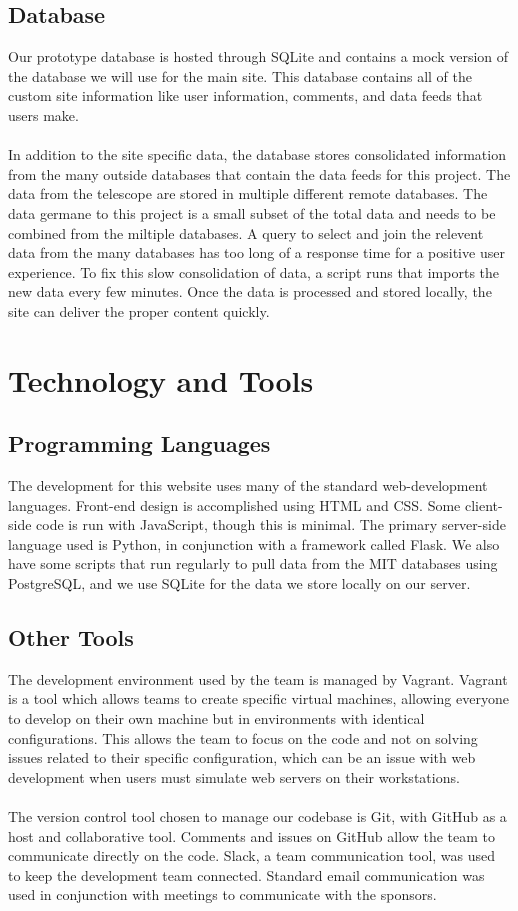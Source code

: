 \documentclass[12pt]{article}
\begin{document}
\begin{spacing}{1.5}
\subsection{Database}
Our prototype database is hosted through SQLite and contains a mock version of the database we will use for the  main site. This database contains all of the custom site information like user information, comments, and data feeds that users make. 
\\ \\
In addition to the site specific data, the database stores consolidated information from the many outside databases that contain the data feeds for this project. The data from the telescope are stored in multiple different remote databases. The data germane to this project is a small subset of the total data and needs to be combined from the miltiple databases. A query to select and join the relevent data from the many databases has too long of a response time for a positive user experience. To fix this slow consolidation of data, a script runs that imports the new data every few minutes. Once the data is processed and stored locally, the site can deliver the proper content quickly.

\section{Technology and Tools}
\subsection{Programming Languages}
The development for this website uses many of the standard web-development languages. Front-end design is accomplished using HTML and CSS. Some client-side code is run with JavaScript, though this is minimal. The primary server-side language used is Python, in conjunction with a framework called Flask. We also have some scripts that run regularly to pull data from the MIT databases using PostgreSQL, and we use SQLite for the data we store locally on our server.

\subsection{Other Tools}
The development environment used by the team is managed by Vagrant. Vagrant is a tool which allows teams to create specific virtual machines, allowing everyone to develop on their own machine but in environments with identical configurations. This allows the team to focus on the code and not on solving issues related to their specific configuration, which can be an issue with web development when users must simulate web servers on their workstations.
\\ \\
The version control tool chosen to manage our codebase is Git, with GitHub as a host and collaborative tool. Comments and issues on GitHub allow the team to communicate directly on the code. Slack, a team communication tool, was used to keep the development team connected. Standard email communication was used in conjunction with meetings to communicate with the sponsors.


\end{spacing}
\end{document}
